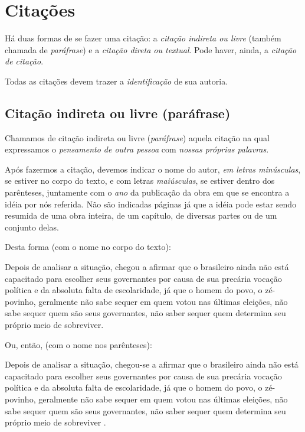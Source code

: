 \chapter{Citações}

Há duas formas de se fazer uma citação: a \emph{citação indireta ou livre} (também chamada de \emph{paráfrase}) e a \emph{citação direta ou textual}. Pode haver, ainda, a \emph{citação de citação}.

Todas as citações devem trazer a \emph{identificação} de sua autoria.

\section{Citação indireta ou livre (paráfrase)}

Chamamos de citação indireta ou livre (\emph{paráfrase}) aquela citação na qual expressamos o \emph{pensamento de outra pessoa} com \emph{nossas próprias palavras}.

Após fazermos a citação, devemos indicar o nome do autor, \emph{em letras minúsculas}, se estiver no corpo do texto, e com letras \emph{maiúsculas}, se estiver dentro dos parênteses, juntamente com o \emph{ano} da publicação da obra em que se encontra a idéia por nós referida. Não são indicadas páginas já que a idéia pode estar sendo resumida de uma obra inteira, de um capítulo, de diversas partes ou de um conjunto delas.

Desta forma (com o nome no corpo do texto):

Depois de analisar a situação,  chegou a afirmar que o brasileiro ainda não está capacitado para escolher seus governantes por causa de sua precária vocação política e da absoluta falta de escolaridade, já que o homem do povo, o zé-povinho, geralmente não sabe sequer em quem votou nas últimas eleições, não sabe sequer quem são seus governantes, não saber sequer quem determina seu próprio meio de sobreviver.

Ou, então, (com o nome nos parênteses):

Depois de analisar a situação, chegou-se a afirmar que o brasileiro ainda não está capacitado para escolher seus governantes por causa de sua precária vocação política e da absoluta falta de escolaridade, já que o homem do povo, o zé-povinho, geralmente não sabe sequer em quem votou nas últimas eleições, não sabe sequer quem são seus governantes, não saber sequer quem determina seu próprio meio de sobreviver \cite{novoa1993}.

